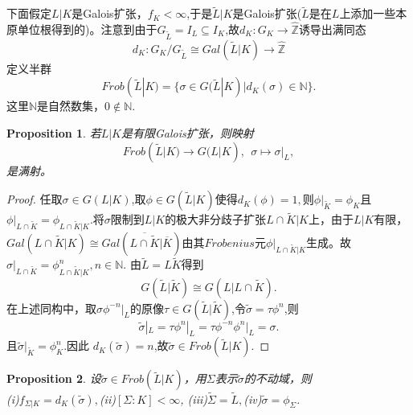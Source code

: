 \documentclass[UTF8]{article}
\newtheorem{prop}{Proposition}[section]
\begin{document}
下面假定$L|K$是Galois扩张，$f_{K}<\infty $,于是$\widetilde{L}|K$是Galois扩张($\widetilde{L}$是在$L$上添加一些本原单位根得到的)。注意到由于$G_{\widetilde{L}}=I_{L}\subseteq I_{K}$,故$d_{K}:G_{K}\rightarrow \widehat{\mathbb{Z}}$诱导出满同态
$$
d_{K}:G_{K}/G_{\widetilde{L}}\cong Gal(\widetilde{L}|K)\rightarrow \widehat{\mathbb{Z}}
$$
定义半群
$$
Frob(\widetilde{L}|K)=\{\sigma \in G(\widetilde{L}|K)|d_{K}(\sigma)\in \mathbb{N}\}.
$$
这里$\mathbb{N}$是自然数集，$0\notin \mathbb{N}$.
\begin{prop}
	若$L|K$是有限Galois扩张，则映射
	$$
	Frob(\widetilde{L}|K)\rightarrow G(L|K),\ \ \sigma \mapsto
	\sigma|_{L},
	$$
	是满射。
\end{prop}
\begin{proof}
	任取$\sigma\in G(L|K)$,取$\phi\in G(\widetilde{L}|K)$使得$d_{K}(\phi)=1,$则$\phi|_{\widetilde{K}}=\phi_{K}$且$\phi|_{L\cap \widetilde{K}}=\phi_{L\cap \widetilde{K}|K}$.将$\sigma$限制到$L|K$的极大非分歧子扩张$L\cap \widetilde{K}|K$上，由于$L|K$有限，$Gal(L\cap\widetilde{K}|K)\cong Gal(\overline{L\cap \widetilde{K}}|\overline{K})$由其$Frobenius$元$\phi|_{L\cap \widetilde{K}|K}$生成。故$\sigma|_{L\cap\widetilde{K}}=\phi_{L\cap \widetilde{K}|K}^{n},n\in \mathbb{N}$.
	由$\widetilde{L}=L\widetilde{K}$得到
	$$
	G(\widetilde{L}|\widetilde{K})\cong G(L|L\cap \widetilde{K})
	.$$
	在上述同构中，取$\sigma \phi^{-n}|_{L}$的原像$\tau\in G(\widetilde{L}|\widetilde{K})$,令$\tilde{\sigma}=\tau\phi^{n}$,则
	$$
	\tilde{\sigma}|_{L}=\tau\phi^{n}|_{L}=\tau\phi^{-n}\phi^{n}
	|_{L}=\sigma.$$
	且$\tilde{\sigma}|_{\widetilde{K}}=\phi_{K}^{n}$.因此
	$d_{K}(\tilde{\sigma})=n$,故$\tilde{\sigma}\in Frob(\widetilde{L}|K).$
\end{proof}
\begin{prop}
	设$\tilde{\sigma}\in Frob(\widetilde{L}|K)$，用$\Sigma$表示$\tilde{\sigma}$的不动域，则\\
	(i)$f_{\Sigma |K}=d_{K}(\tilde{\sigma}),$(ii)$[\Sigma:K]<\infty$,
	(iii)$\widetilde{\Sigma}=\widetilde{L},$(iv)$\tilde{\sigma}=\phi_{\Sigma}$.
\end{prop}
\end{document}
